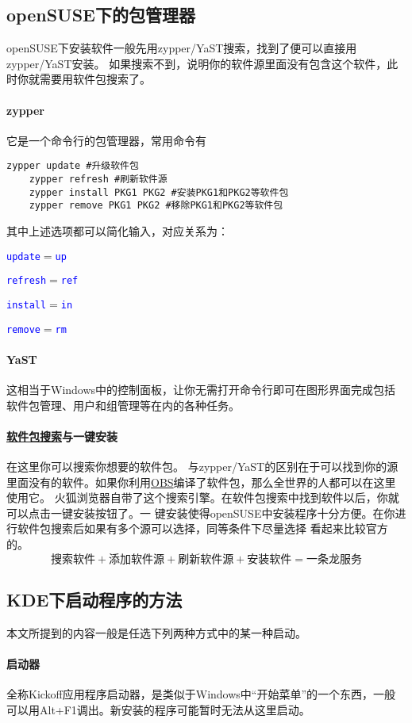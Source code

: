 \documentclass[10pt,openany]{book}
\newcommand{\command}[1]{\texttt{\textcolor{blue}{#1}}}
\newcommand{\simp}[2]{\command{#1}$=$\command{#2}}
\begin{document}
\subsection[包管理器]{openSUSE下的包管理器}
openSUSE下安装软件一般先用zypper/YaST搜索，找到了便可以直接用zypper/YaST安装。
如果搜索不到，说明你的软件源里面没有包含这个软件，此时你就需要用软件包搜索了。
\paragraph{zypper}\label{pre} 它是一个命令行的包管理器，常用命令有
\begin{Verbatim}[formatcom=\color{codecolor}]
    zypper update #升级软件包
    zypper refresh #刷新软件源
    zypper install PKG1 PKG2 #安装PKG1和PKG2等软件包
    zypper remove PKG1 PKG2 #移除PKG1和PKG2等软件包
\end{Verbatim}
其中上述选项都可以简化输入，对应关系为：\begin{inparaitem}
 \item \simp{update}{up}
 \item \simp{refresh}{ref}
 \item \simp{install}{in}
 \item \simp{remove}{rm}
\end{inparaitem}
\paragraph{YaST} 这相当于Windows中的控制面板，让你无需打开命令行即可在图形界面完成包括软件包管理、用户和组管理等在内的各种任务。
\paragraph[软件包搜索与一键安装]{\href{http://software.opensuse.org/packages}{软件包搜索}与一键安装} 在这里你可以搜索你想要的软件包。
与zypper/YaST的区别在于可以找到你的源里面没有的软件。如果你利用\href{https://build.opensuse.org/}{OBS}编译了软件包，那么全世界的人都可以在这里使用它。
火狐浏览器自带了这个搜索引擎。在软件包搜索中找到软件以后，你就可以点击一键安装按钮了。一
键安装使得openSUSE中安装程序十分方便。在你进行软件包搜索后如果有多个源可以选择，同等条件下尽量选择
看起来比较官方的。\[\text{搜索软件}+\text{添加软件源}+\text{刷新软件源}+\text{安装软件}=\text{一条龙服务}\]
\subsection{KDE下启动程序的方法}
本文所提到的内容一般是任选下列两种方式中的某一种启动。
\paragraph{启动器} 全称Kickoff应用程序启动器，是类似于Windows中“开始菜单”的一个东西，一般可以用Alt+F1调出。新安装的程序可能暂时无法从这里启动。
\end{document}

